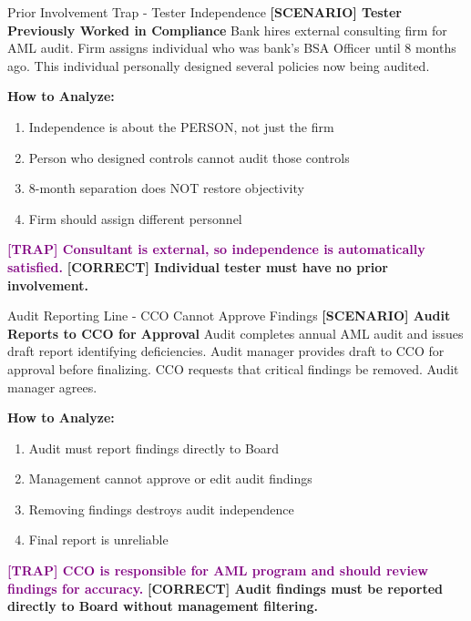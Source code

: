 \documentclass[11pt,a4paper]{beamer}
\newcommand{\trap}[1]{\textcolor{purple}{\textbf{[TRAP] #1}}}
\newcommand{\correct}[1]{\textcolor{green!50!black}{\textbf{[CORRECT] #1}}}
\newcommand{\scenario}[1]{\textcolor{blue!70!black}{\textbf{[SCENARIO] #1}}}
\begin{document}
	\begin{frame}{Prior Involvement Trap - Tester Independence}
		\scenario{Tester Previously Worked in Compliance}
		Bank hires external consulting firm for AML audit. Firm assigns individual who was bank's BSA Officer until 8 months ago. This individual personally designed several policies now being audited.
		
		\vspace{0.1cm}
		\textbf{How to Analyze:}
		\begin{enumerate}
			\item Independence is about the PERSON, not just the firm
			\item Person who designed controls cannot audit those controls
			\item 8-month separation does NOT restore objectivity
			\item Firm should assign different personnel
		\end{enumerate}
		\trap{Consultant is external, so independence is automatically satisfied.}
		\correct{Individual tester must have no prior involvement.}
	\end{frame}
	
	\begin{frame}{Audit Reporting Line - CCO Cannot Approve Findings}
		\scenario{Audit Reports to CCO for Approval}
		Audit completes annual AML audit and issues draft report identifying deficiencies. Audit manager provides draft to CCO for approval before finalizing. CCO requests that critical findings be removed. Audit manager agrees.
		
		\vspace{0.1cm}
		\textbf{How to Analyze:}
		\begin{enumerate}
			\item Audit must report findings directly to Board
			\item Management cannot approve or edit audit findings
			\item Removing findings destroys audit independence
			\item Final report is unreliable
		\end{enumerate}
		\trap{CCO is responsible for AML program and should review findings for accuracy.}
		\correct{Audit findings must be reported directly to Board without management filtering.}
	\end{frame}
	
\end{document}
